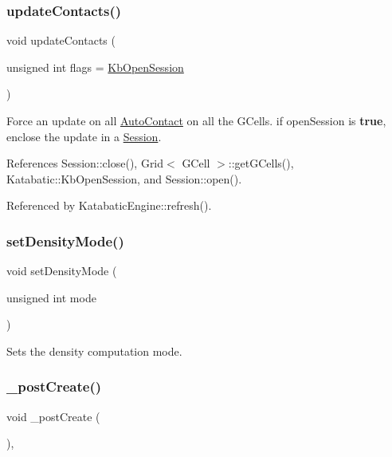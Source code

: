 \subsubsection{\texorpdfstring{update\+Contacts()}{updateContacts()}}
{\footnotesize\ttfamily void update\+Contacts (\begin{DoxyParamCaption}\item[{unsigned int}]{flags = {\ttfamily \mbox{\hyperlink{namespaceKatabatic_a2af2ad6b6441614038caf59d04b3b217af314588109fcc5f5ee1c42e5fd4d0ed5}{Kb\+Open\+Session}}} }\end{DoxyParamCaption})}

Force an update on all \mbox{\hyperlink{classKatabatic_1_1AutoContact}{Auto\+Contact}} on all the G\+Cells. if {\ttfamily open\+Session} is {\bfseries true}, enclose the update in a \mbox{\hyperlink{classKatabatic_1_1Session}{Session}}. 

References Session\+::close(), Grid$<$ G\+Cell $>$\+::get\+G\+Cells(), Katabatic\+::\+Kb\+Open\+Session, and Session\+::open().



Referenced by Katabatic\+Engine\+::refresh().

\mbox{\label{classKatabatic_1_1GCellGrid_a86899930041463cf80b713c3ca5b4834}} 
\subsubsection{\texorpdfstring{set\+Density\+Mode()}{setDensityMode()}}
{\footnotesize\ttfamily void set\+Density\+Mode (\begin{DoxyParamCaption}\item[{unsigned int}]{mode }\end{DoxyParamCaption})\hspace{0.3cm}{\ttfamily [inline]}}

Sets the density computation mode. \mbox{\label{classKatabatic_1_1GCellGrid_a3715b38135ca24745f610bebd3407c10}} 
\subsubsection{\texorpdfstring{\+\_\+post\+Create()}{\_postCreate()}}
{\footnotesize\ttfamily void \+\_\+post\+Create (\begin{DoxyParamCaption}{ }\end{DoxyParamCaption})\hspace{0.3cm}{\ttfamily [protected]}, {\ttfamily [virtual]}}


